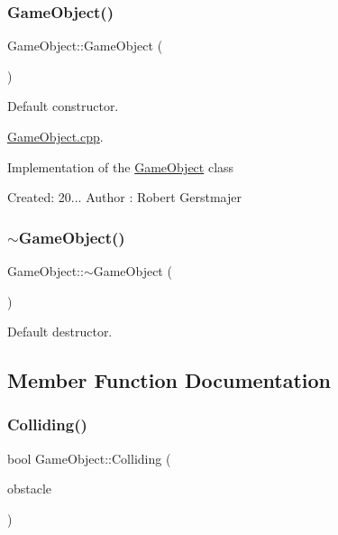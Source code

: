\subsubsection{\texorpdfstring{Game\+Object()}{GameObject()}}
{\footnotesize\ttfamily Game\+Object\+::\+Game\+Object (\begin{DoxyParamCaption}{ }\end{DoxyParamCaption})}



Default constructor. 

\mbox{\hyperlink{_game_object_8cpp}{Game\+Object.\+cpp}}.

Implementation of the \mbox{\hyperlink{class_game_object}{Game\+Object}} class

Created\+: 20... Author \+: Robert Gerstmajer \mbox{\label{class_game_object_ab82dfdb656f9051c0587e6593b2dda97}} 
\subsubsection{\texorpdfstring{$\sim$\+Game\+Object()}{~GameObject()}}
{\footnotesize\ttfamily Game\+Object\+::$\sim$\+Game\+Object (\begin{DoxyParamCaption}{ }\end{DoxyParamCaption})}



Default destructor. 



\subsection{Member Function Documentation}
\mbox{\label{class_game_object_a9f63ba7fa09d165f175858276f71d44b}} 
\subsubsection{\texorpdfstring{Colliding()}{Colliding()}}
{\footnotesize\ttfamily bool Game\+Object\+::\+Colliding (\begin{DoxyParamCaption}\item[{\mbox{\hyperlink{class_game_object}{Game\+Object}} $\ast$}]{obstacle }\end{DoxyParamCaption})}



